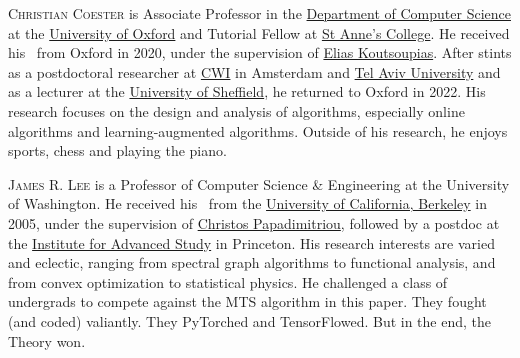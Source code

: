 \documentclass{toc}
\begin{document}
%
%
%
%
%
%
%
%
%
%
%
%
%
%
\begin{tocaboutauthors}
\begin{tocabout}[coester]
  \textsc{Christian Coester} is Associate Professor in the \href{https://www.cs.ox.ac.uk/}{Department of Computer Science} at the \href{https://www.ox.ac.uk/}{University of Oxford} and Tutorial Fellow at \href{https://www.st-annes.ox.ac.uk/}{St Anne's College}. He received his \phd\ from Oxford in 2020, under the supervision of \href{http://www.cs.ox.ac.uk/people/elias.koutsoupias/Personal/}{Elias Koutsoupias}. After stints as a postdoctoral researcher at \href{https://www.cwi.nl/}{CWI} in Amsterdam and \href{https://english.tau.ac.il/}{Tel Aviv University} and as a lecturer at the \href{https://www.sheffield.ac.uk/}{University of Sheffield}, he returned to Oxford in 2022. His research focuses on the design and analysis of algorithms, especially online algorithms and learning-augmented algorithms. Outside of his research, he enjoys sports, chess and playing the piano.%
\end{tocabout}
\begin{tocabout}[lee]
   \textsc{James R. Lee} is a Professor of Computer Science \& Engineering
   at the University of Washington.
He received his \phd\ from the
\href{http://www.berkeley.edu/}{University of California, Berkeley} in 2005,
under the supervision of \href{https://www.engineering.columbia.edu/faculty/christos-papadimitriou}{Christos Papadimitriou},
followed by a postdoc at the \href{http://ias.edu/}{Institute for Advanced Study} in Princeton.
His research interests are varied and eclectic, ranging from spectral graph algorithms to
functional analysis, and from convex optimization to statistical physics.
He challenged a class of undergrads to compete against the MTS algorithm in this paper.
They fought (and coded) valiantly.  They PyTorched and TensorFlowed.
But in the end, the Theory won.
\end{tocabout}
\end{tocaboutauthors}
\end{document}
